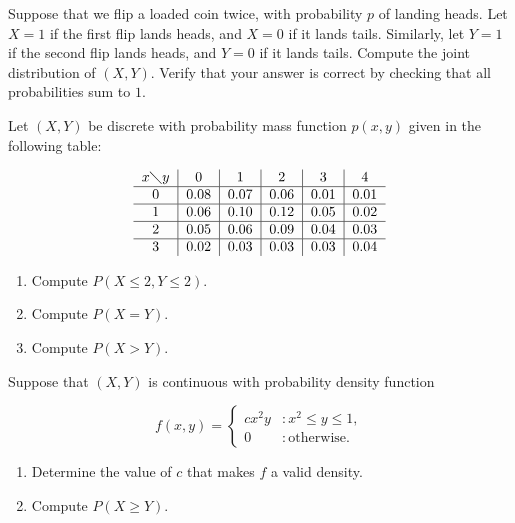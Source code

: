 \documentclass[12pt,reqno]{amsart}
\begin{document}
\bigskip

\prob Suppose that we flip a loaded coin twice, with probability $p$ of landing heads. Let $X=1$ if the first flip lands heads, and $X=0$ if it lands tails. Similarly, let $Y=1$ if the second flip lands heads, and $Y=0$ if it lands tails. Compute the joint distribution of $(X,Y)$. Verify that your answer is correct by checking that all probabilities sum to $1$.\vfill














\prob Let $(X,Y)$ be discrete with probability mass function $p(x,y)$ given in the following table:


\[\begin{tabular}{c|c|c|c|c|c}
$x \diagdown y$ & 0 & 1 & 2 & 3 & 4  \\ \hline
0 & 0.08 & 0.07 & 0.06 & 0.01 & 0.01 \\ \hline
1 & 0.06 & 0.10 & 0.12 & 0.05 & 0.02 \\ \hline
2 & 0.05 & 0.06 & 0.09 & 0.04 & 0.03 \\ \hline
3 & 0.02 & 0.03 & 0.03 & 0.03 & 0.04 
\end{tabular}\]

\medskip
\begin{enumerate}
\item Compute $P(X\leq 2, Y\leq 2)$.\vfill
\item Compute $P(X=Y)$.\vfill
\item Compute $P(X>Y)$.\vfill
\end{enumerate}
















\newpage
\prob Suppose that $(X,Y)$ is continuous with probability density function

	\[
	f(x,y) = \begin{cases}
	cx^2 y & : x^2 \leq y \leq 1, \\
	0 & : \text{otherwise}.
	\end{cases}
	\]

\medskip
\begin{enumerate}
\item Determine the value of $c$ that makes $f$ a valid density.\vfill
\item Compute $P(X\geq Y)$.\vfill
\end{enumerate}
\end{document}

